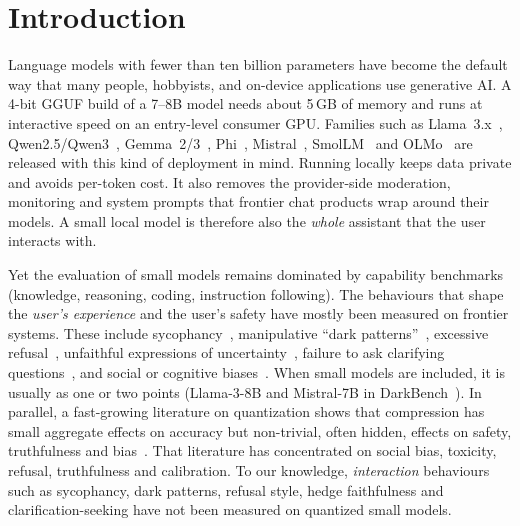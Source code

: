 \section{Introduction}
\label{sec:intro}

Language models with fewer than ten billion parameters have become the
default way that many people, hobbyists, and on-device applications use
generative AI. A 4-bit GGUF build of a 7--8B model needs about 5\,GB of
memory and runs at interactive speed on an entry-level consumer GPU. Families
such as Llama~3.x~\citep{grattafiori2024llama3}, Qwen2.5/Qwen3~\citep{qwen2025qwen25,yang2025qwen3},
Gemma~2/3~\citep{gemmateam2024gemma2,gemmateam2025gemma3}, Phi~\citep{abdin2024phi3,microsoft2025phi4mini},
Mistral~\citep{jiang2023mistral}, SmolLM~\citep{allal2025smollm2} and
OLMo~\citep{olmo2024olmo2} are released with this kind of deployment in mind.
Running locally keeps data private and avoids per-token cost. It also removes
the provider-side moderation, monitoring and system prompts that frontier chat
products wrap around their models. A small local model is therefore also the
\emph{whole} assistant that the user interacts with.

Yet the evaluation of small models remains dominated by capability
benchmarks (knowledge, reasoning, coding, instruction following). The
behaviours that shape the \emph{user's experience} and the user's safety have
mostly been measured on frontier systems. These include sycophancy~\citep{sharma2024sycophancy,cheng2025elephant},
manipulative ``dark patterns''~\citep{kran2025darkbench}, excessive refusal~\citep{rottger2024xstest,cui2025orbench},
unfaithful expressions of uncertainty~\citep{yona2024faithfully,liu2025metafaith},
failure to ask clarifying questions~\citep{zhang2024clamber}, and social or
cognitive biases~\citep{parrish2022bbq,bai2025implicit,malberg2024cognitive}.
When small models are included, it is usually as one or two points (\eg Llama-3-8B
and Mistral-7B in DarkBench~\citep{kran2025darkbench}). In parallel, a fast-growing
literature on quantization shows that compression has small aggregate effects on
accuracy but non-trivial, often hidden, effects on safety, truthfulness and
bias~\citep{hong2024decoding,kharinaev2025investigating,fu2025quantized,marcuzzi2026quantization,hua2026uncertainty,rath2026quantization,ferrara2026quantibias}.
That literature has concentrated on social bias, toxicity, refusal, truthfulness and
calibration. To our knowledge, \emph{interaction} behaviours such as sycophancy, dark
patterns, refusal style, hedge faithfulness and clarification-seeking have not been
measured on quantized small models.


